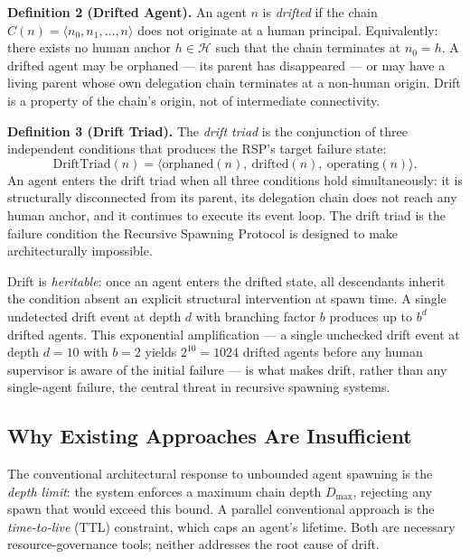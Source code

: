 \medskip
\noindent\textbf{Definition 2 (Drifted Agent).} An agent $n$ is \emph{drifted} if the chain $C(n) = \langle n_0, n_1, \ldots, n \rangle$ does not originate at a human principal. Equivalently: there exists no human anchor $h \in \mathcal{H}$ such that the chain terminates at $n_0 = h$. A drifted agent may be orphaned — its parent has disappeared — or may have a living parent whose own delegation chain terminates at a non-human origin. Drift is a property of the chain's origin, not of intermediate connectivity.

\medskip
\noindent\textbf{Definition 3 (Drift Triad).} The \emph{drift triad} is the conjunction of three independent conditions that produces the RSP's target failure state:
\begin{equation}
\text{DriftTriad}(n) = \langle \text{orphaned}(n),\ \text{drifted}(n),\ \text{operating}(n) \rangle.
\label{eq:intro-drift-triad}
\end{equation}
An agent enters the drift triad when all three conditions hold simultaneously: it is structurally disconnected from its parent, its delegation chain does not reach any human anchor, and it continues to execute its event loop. The drift triad is the failure condition the Recursive Spawning Protocol is designed to make architecturally impossible.

Drift is \emph{heritable}: once an agent enters the drifted state, all descendants inherit the condition absent an explicit structural intervention at spawn time. A single undetected drift event at depth $d$ with branching factor $b$ produces up to $b^d$ drifted agents. This exponential amplification — a single unchecked drift event at depth $d=10$ with $b=2$ yields $2^{10}=1024$ drifted agents before any human supervisor is aware of the initial failure — is what makes drift, rather than any single-agent failure, the central threat in recursive spawning systems.

\subsection{Why Existing Approaches Are Insufficient}

The conventional architectural response to unbounded agent spawning is the \emph{depth limit}: the system enforces a maximum chain depth $D_{\max}$, rejecting any spawn that would exceed this bound. A parallel conventional approach is the \emph{time-to-live} (TTL) constraint, which caps an agent's lifetime. Both are necessary resource-governance tools; neither addresses the root cause of drift.


